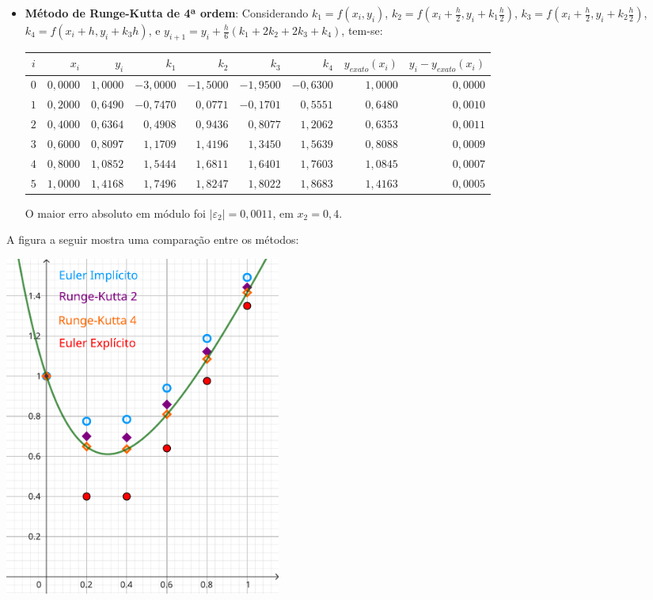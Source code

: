 \documentclass[12pt,a4paper]{article}
\begin{document}
\begin{enumerate}
\begin{itemize}
\item \textbf{Método de Runge-Kutta de 4ª ordem}: Considerando
$k_1 = f(x_i, y_i)$,
$k_2 = f(x_i + \frac{h}{2}, y_i + k_1 \frac{h}{2})$,
$k_3 = f(x_i + \frac{h}{2}, y_i + k_2 \frac{h}{2})$,
$k_4 = f(x_i +       h    , y_i + k_3 h)$, e
$y_{i+1} = y_i + \frac{h}{6} (k_1 + 2k_2 + 2k_3 + k_4)$, tem-se:
\begin{center}
   \begin{footnotesize}
      \begin{tabular}{crrrrrrrr}
      \hline
        $i$ & $x_i$  & $y_i$ & $k_1$ & $k_2$ & $k_3$ & $k_4$ & $y_{exato}(x_i)$
        & $y_i-y_{exato}(x_i)$ \\ \hline
      $0$ & $0,0000$ & $1,0000$ & $-3,0000$ & $-1,5000$ & $-1,9500$ & $-0,6300$ & $1,0000$ & $0,0000$ \\
      $1$ & $0,2000$ & $0,6490$ & $-0,7470$ & $ 0,0771$ & $-0,1701$ & $ 0,5551$ & $0,6480$ & $0,0010$ \\
      $2$ & $0,4000$ & $0,6364$ & $ 0,4908$ & $ 0,9436$ & $ 0,8077$ & $ 1,2062$ & $0,6353$ & $0,0011$ \\
      $3$ & $0,6000$ & $0,8097$ & $ 1,1709$ & $ 1,4196$ & $ 1,3450$ & $ 1,5639$ & $0,8088$ & $0,0009$ \\
      $4$ & $0,8000$ & $1,0852$ & $ 1,5444$ & $ 1,6811$ & $ 1,6401$ & $ 1,7603$ & $1,0845$ & $0,0007$ \\
      $5$ & $1,0000$ & $1,4168$ & $ 1,7496$ & $ 1,8247$ & $ 1,8022$ & $ 1,8683$ & $1,4163$ & $0,0005$ \\
      \hline
      \end{tabular}
   \end{footnotesize}
\end{center}
O maior erro absoluto em módulo foi $|\varepsilon_2| = 0,0011$, em $x_2 = 0,4$.
\end{itemize}

A figura a seguir mostra uma comparação entre os métodos:
\begin{center}
   \includegraphics[width=0.4\textwidth]{img/edo-comparação.pdf}
\end{center}
\end{enumerate}
\end{document}
